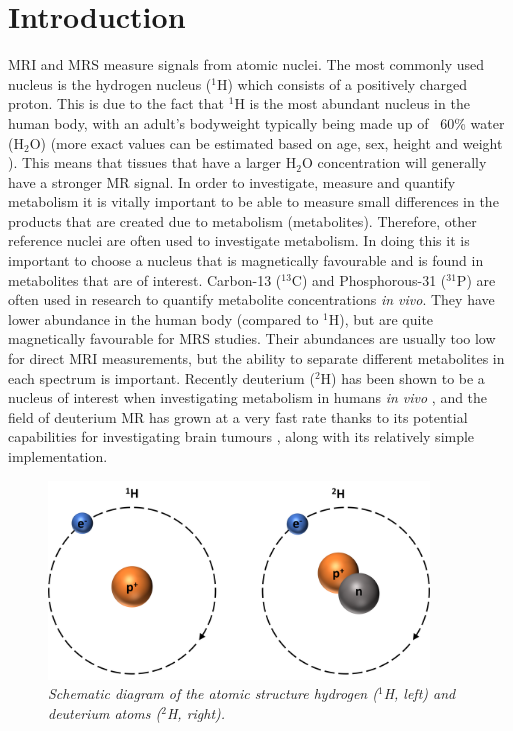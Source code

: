 \chapter{Introduction}
\label{Chap:Introduction}

\Ac{MRI} and \ac{MRS} measure signals from atomic nuclei. The most commonly used nucleus is the hydrogen nucleus ($^1$H) which consists of a positively charged proton. This is due to the fact that $^1$H is the most abundant nucleus in the human body, with an adult's bodyweight typically being made up of ~60\% water (H$_2$O) (more exact values can be estimated based on age, sex, height and weight \cite{Watson1980TotalMeasurements}). This means that tissues that have a larger H$_2$O concentration will generally have a stronger MR signal. In order to investigate, measure and quantify metabolism it is vitally important to be able to measure small differences in the products that are created due to metabolism (metabolites). Therefore, other reference nuclei are often used to investigate metabolism. In doing this it is important to choose a nucleus that is magnetically favourable and is found in metabolites that are of interest. Carbon-13 ($^{13}$C) \cite{Grist2019QuantifyingImaging,Brender2019DynamicHyperpolarization} and Phosphorous-31 ($^{31}$P) \cite{Gordon1980LocalizationResonance} are often used in research to quantify metabolite concentrations \textit{in vivo}. They have lower abundance in the human body (compared to $^1$H), but are quite magnetically favourable for MRS studies. Their abundances are usually too low for direct \ac{MRI} measurements, but the ability to separate different metabolites in each spectrum is important. Recently deuterium ($^2$H) has been shown to be a nucleus of interest when investigating metabolism in humans \textit{in vivo} \cite{Lu2017QuantitativeSpectroscopy,DeFeyter2018DeuteriumVivo}, and the field of deuterium MR has grown at a very fast rate thanks to its potential capabilities for investigating brain tumours \cite{DeFeyter2018DeuteriumVivo}, along with its relatively simple implementation.

\begin{figure}
    \centering
    \includegraphics[width=0.9\textwidth]{Figures/Intro/1H2H.png}
    \caption{\textit{Schematic diagram of the atomic structure hydrogen ($^1$H, left) and deuterium atoms ($^2$H, right).}}
    \label{fig:intro:1H2H}
\end{figure}

